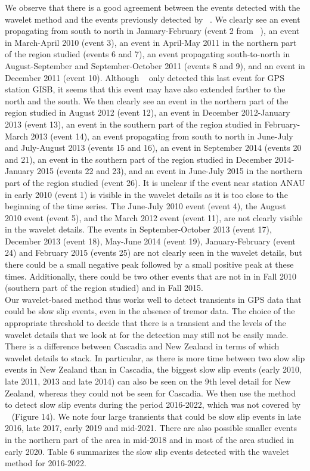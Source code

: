 \documentclass{article}
\begin{document}
We observe that there is a good agreement between the events detected with the wavelet method and the events previously detected by ~\citet{TOD_2016}. We clearly see an event propagating from south to north in January-February (event 2 from ~\citet{TOD_2016}), an event in March-April 2010 (event 3), an event in April-May 2011 in the northern part of the region studied (events 6 and 7), an event propagating south-to-north in August-September and September-October 2011 (events 8 and 9), and an event in December 2011 (event 10). Although ~\citet{TOD_2016} only detected this last event for GPS station GISB, it seems that this event may have also extended farther to the north and the south. We then clearly see an event in the northern part of the region studied in August 2012 (event 12), an event in December 2012-January 2013 (event 13), an event in the southern part of the region studied in February-March 2013 (event 14), an event propagating from south to north in June-July and July-August 2013 (events 15 and 16), an event in September 2014 (events 20 and 21), an event in the southern part of the region studied in December 2014-January 2015 (events 22 and 23), and an event in June-July 2015 in the northern part of the region studied (event 26). It is unclear if the event near station ANAU in early 2010 (event 1) is visible in the wavelet details as it is too close to the beginning of the time series. The June-July 2010 event (event 4), the August 2010 event (event 5), and the March 2012 event (event 11), are not clearly visible in the wavelet details. The events in September-October 2013 (event 17), December 2013 (event 18), May-June 2014 (event 19), January-February (event 24) and February 2015 (events 25) are not clearly seen in the wavelet details, but there could be a small negative peak followed by a small positive peak at these times. Additionally, there could be two other events that are not in \citep{TOD_2016} in Fall 2010 (southern part of the region studied) and in Fall 2015. \\

Our wavelet-based method thus works well to detect transients in GPS data that could be slow slip events, even in the absence of tremor data. The choice of the appropriate threshold to decide that there is a transient and the levels of the wavelet details that we look at for the detection may still not be easily made. There is a difference between Cascadia and New Zealand in terms of which wavelet details to stack. In particular, as there is more time between two slow slip events in New Zealand than in Cascadia, the biggest slow slip events (early 2010, late 2011, 2013 and late 2014) can also be seen on the 9th level detail for New Zealand, whereas they could not be seen for Cascadia. We then use the method to detect slow slip events during the period 2016-2022, which was not covered by ~\citet{TOD_2016} (Figure 14). We note four large transients that could be slow slip events in late 2016, late 2017, early 2019 and mid-2021. There are also possible smaller events in the northern part of the area in mid-2018 and in most of the area studied in early 2020. Table 6 summarizes the slow slip events detected with the wavelet method for 2016-2022. \\
\end{document}
